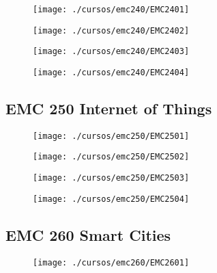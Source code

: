 \begin{figure}[!ht]
    \centering
    \texttt{[image: ./cursos/emc240/EMC2401]}
\end{figure}
\clearpage

\begin{figure}[!ht]
    \centering
    \texttt{[image: ./cursos/emc240/EMC2402]}
\end{figure}
\clearpage

\begin{figure}[!ht]
    \centering
    \texttt{[image: ./cursos/emc240/EMC2403]}
\end{figure}
\clearpage

\begin{figure}[!ht]
    \centering
    \texttt{[image: ./cursos/emc240/EMC2404]}
\end{figure}
\clearpage



\subsection{EMC 250 Internet of Things} 




\begin{figure}[!ht]
    \centering
    \texttt{[image: ./cursos/emc250/EMC2501]}
\end{figure}
\clearpage

\begin{figure}[!ht]
    \centering
    \texttt{[image: ./cursos/emc250/EMC2502]}
\end{figure}
\clearpage

\begin{figure}[!ht]
    \centering
    \texttt{[image: ./cursos/emc250/EMC2503]}
\end{figure}
\clearpage

\begin{figure}[!ht]
    \centering
    \texttt{[image: ./cursos/emc250/EMC2504]}
\end{figure}
\clearpage



\subsection{EMC 260 Smart Cities} 


\begin{figure}[!ht]
    \centering
    \texttt{[image: ./cursos/emc260/EMC2601]}
\end{figure}
\clearpage

